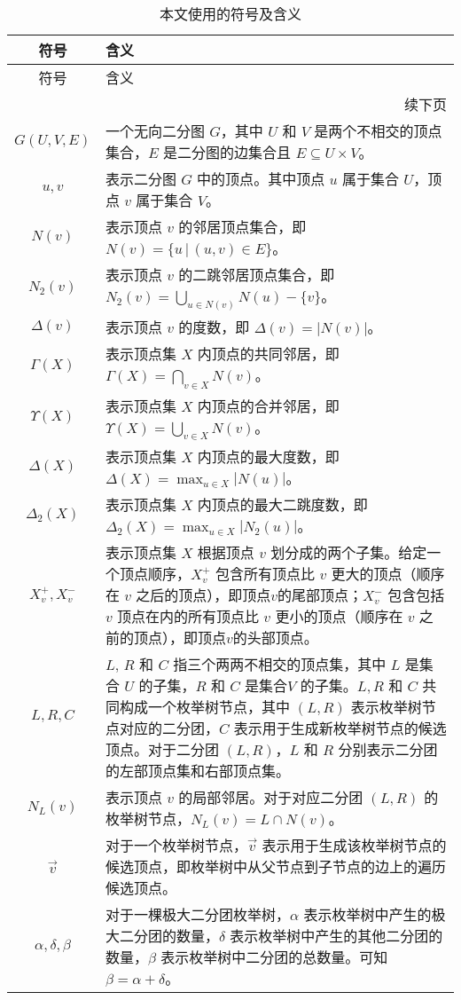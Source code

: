 \begin{longtable}[htbp]{|c|p{12cm}|}
    \caption{本文使用的符号及含义}
    \label{tab:definition} \\
    
    \hline
    符号 & 含义 \\ \hline
    \endfirsthead
    
    \hline
    符号 & 含义 \\ \hline
    \endhead
    
    \hline
    \multicolumn{2}{r}{续下页} \\
    \endfoot
    
    \hline
    \endlastfoot
    
    $G(U,V,E)$ & 一个无向二分图 $G$，其中 $U$ 和 $V$ 是两个不相交的顶点集合，$E$ 是二分图的边集合且 $E \subseteq U \times V$。 \\ \hline
    $u,v$ & 表示二分图 $G$ 中的顶点。其中顶点 $u$ 属于集合 $U$，顶点 $v$ 属于集合 $V$。 \\ \hline
    $N(v)$ & 表示顶点 $v$ 的邻居顶点集合，即 $N(v) = \{u \,|\, (u,v) \in E\}$。 \\ \hline
    $N_2(v)$ & 表示顶点 $v$ 的二跳邻居顶点集合，即 $N_2(v) = \bigcup_{u \in N(v)} N(u) - \{v\}$。 \\ \hline
    $\Delta(v)$ & 表示顶点 $v$ 的度数，即 $\Delta(v) = |N(v)|$。 \\ \hline
    $\Gamma(X)$ & 表示顶点集 $X$ 内顶点的共同邻居，即 $\Gamma(X) = \bigcap_{v \in X} N(v)$。 \\ \hline
    $\Upsilon(X)$ & 表示顶点集 $X$ 内顶点的合并邻居，即 $\Upsilon(X) = \bigcup_{v \in X} N(v)$。 \\ \hline
    $\Delta(X)$ & 表示顶点集 $X$ 内顶点的最大度数，即 $\Delta(X) = \max_{u \in X} |N(u)|$。 \\ \hline
    $\Delta_2(X)$ & 表示顶点集 $X$ 内顶点的最大二跳度数，即 $\Delta_2(X) = \max_{u \in X} |N_2(u)|$。 \\ \hline
    $X_v^+, X_v^-$ & 表示顶点集 $X$ 根据顶点 $v$ 划分成的两个子集。给定一个顶点顺序，$X_v^+$ 包含所有顶点比 $v$ 更大的顶点（顺序在 $v$ 之后的顶点），即顶点$v$的尾部顶点；$X_v^-$ 包含包括 $v$ 顶点在内的所有顶点比 $v$ 更小的顶点（顺序在 $v$ 之前的顶点），即顶点$v$的头部顶点。 \\ \hline
    $L,R,C$ & $L$, $R$ 和 $C$ 指三个两两不相交的顶点集，其中 $L$ 是集合 $U$ 的子集，$R$ 和 $C$ 是集合$V$ 的子集。$L,R$ 和 $C$ 共同构成一个枚举树节点，其中 $(L,R)$ 表示枚举树节点对应的二分团，$C$ 表示用于生成新枚举树节点的候选顶点。对于二分团 $(L,R)$，$L$ 和 $R$ 分别表示二分团的左部顶点集和右部顶点集。 \\ \hline
    $N_L(v)$ & 表示顶点 $v$ 的局部邻居。对于对应二分团 $(L,R)$ 的枚举树节点，$N_L(v) = L \cap N(v)$。 \\ \hline
    $\vec{v}$ & 对于一个枚举树节点，$\vec{v}$ 表示用于生成该枚举树节点的候选顶点，即枚举树中从父节点到子节点的边上的遍历候选顶点。 \\ \hline
    $\alpha, \delta, \beta$ & 对于一棵极大二分团枚举树，$\alpha$ 表示枚举树中产生的极大二分团的数量，$\delta$ 表示枚举树中产生的其他二分团的数量，$\beta$ 表示枚举树中二分团的总数量。可知 $\beta = \alpha + \delta$。 \\ \hline
\end{longtable}

